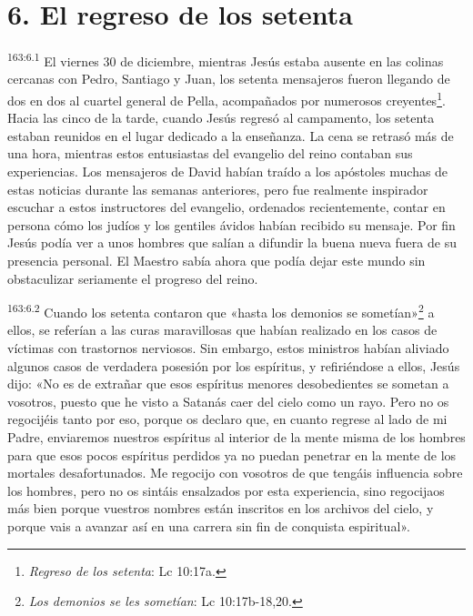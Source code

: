 \section*{6. El regreso de los setenta}
\par 
\textsuperscript{163:6.1} El viernes 30 de diciembre, mientras Jesús estaba ausente en las colinas cercanas con Pedro, Santiago y Juan, los setenta mensajeros fueron llegando de dos en dos al cuartel general de Pella, acompañados por numerosos creyentes\footnote{\textit{Regreso de los setenta}: Lc 10:17a.}. Hacia las cinco de la tarde, cuando Jesús regresó al campamento, los setenta estaban reunidos en el lugar dedicado a la enseñanza. La cena se retrasó más de una hora, mientras estos entusiastas del evangelio del reino contaban sus experiencias. Los mensajeros de David habían traído a los apóstoles muchas de estas noticias durante las semanas anteriores, pero fue realmente inspirador escuchar a estos instructores del evangelio, ordenados recientemente, contar en persona cómo los judíos y los gentiles ávidos habían recibido su mensaje. Por fin Jesús podía ver a unos hombres que salían a difundir la buena nueva fuera de su presencia personal. El Maestro sabía ahora que podía dejar este mundo sin obstaculizar seriamente el progreso del reino.

\par 
\textsuperscript{163:6.2} Cuando los setenta contaron que «hasta los demonios se sometían»\footnote{\textit{Los demonios se les sometían}: Lc 10:17b-18,20.} a ellos, se referían a las curas maravillosas que habían realizado en los casos de víctimas con trastornos nerviosos. Sin embargo, estos ministros habían aliviado algunos casos de verdadera posesión por los espíritus, y refiriéndose a ellos, Jesús dijo: «No es de extrañar que esos espíritus menores desobedientes se sometan a vosotros, puesto que he visto a Satanás caer del cielo como un rayo. Pero no os regocijéis tanto por eso, porque os declaro que, en cuanto regrese al lado de mi Padre, enviaremos nuestros espíritus al interior de la mente misma de los hombres para que esos pocos espíritus perdidos ya no puedan penetrar en la mente de los mortales desafortunados. Me regocijo con vosotros de que tengáis influencia sobre los hombres, pero no os sintáis ensalzados por esta experiencia, sino regocijaos más bien porque vuestros nombres están inscritos en los archivos del cielo, y porque vais a avanzar así en una carrera sin fin de conquista espiritual».

